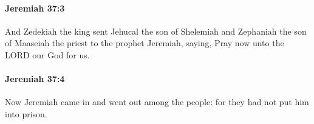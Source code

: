 		\paragraph{Jeremiah 37:3} %
			\label{JEREMIAH-37-3}

			And Zedekiah the king sent Jehucal the son of Shelemiah and Zephaniah the son of Maaseiah the priest to the prophet Jeremiah, saying, Pray now unto the LORD our God for us.


		\paragraph{Jeremiah 37:4} %
			\label{JEREMIAH-37-4}

			Now Jeremiah came in and went out among the people: for they had not put him into prison.


